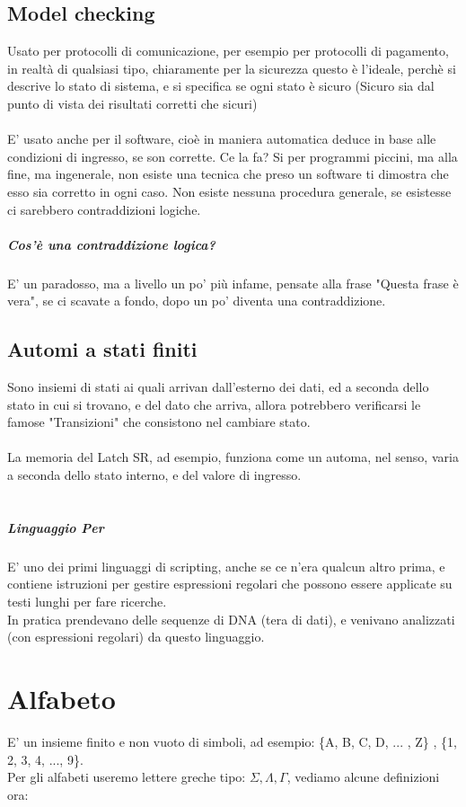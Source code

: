 \documentclass[12pt, a4paper, openany, oneside]{book}
\begin{document}
\section{Model checking}
Usato per protocolli di comunicazione, per esempio per protocolli di pagamento,
in realtà di qualsiasi tipo, chiaramente per la sicurezza questo è l'ideale, 
perchè si descrive lo stato di sistema, e si specifica se ogni stato è sicuro
(Sicuro sia dal punto di vista dei risultati corretti che sicuri)
\\ \\
E' usato anche per il software, cioè in maniera automatica deduce in base alle
condizioni di ingresso, se son corrette. Ce la fa? Si per programmi piccini, 
ma alla fine, ma ingenerale, non esiste una tecnica che preso un software ti 
dimostra che esso sia corretto in ogni caso. Non esiste nessuna procedura generale,
se esistesse ci sarebbero contraddizioni logiche.
\paragraph{Cos'è una contraddizione logica?} 
E' un paradosso, ma a livello un po' più infame, pensate alla frase "Questa 
frase è vera", se ci scavate a fondo, dopo un po' diventa una contraddizione.
\section{Automi a stati finiti}
Sono insiemi di stati ai quali arrivan dall'esterno dei dati, ed a seconda dello
stato in cui si trovano, e del dato che arriva, allora potrebbero verificarsi le
famose "Transizioni" che consistono nel cambiare stato.
\\ \\ 
La memoria del Latch SR, ad esempio, funziona come un automa, nel senso, varia
a seconda dello stato interno, e del valore di ingresso.
\\ \\
\paragraph{Linguaggio Per} E' uno dei primi linguaggi di scripting, anche se ce 
n'era qualcun altro prima, e contiene istruzioni per gestire espressioni regolari
che possono essere applicate su testi lunghi per fare ricerche.\\ 
In pratica prendevano delle sequenze di DNA (tera di dati), e venivano analizzati
(con espressioni regolari) da questo linguaggio.
\chapter{Alfabeto}
E' un insieme finito e non vuoto di simboli, ad esempio:
\{A, B, C, D, ... , Z\} , \{1, 2, 3, 4, ..., 9\}. \\ 
Per gli alfabeti useremo lettere greche tipo: $\Sigma, \Lambda, \Gamma$, vediamo
alcune definizioni ora:
\end{document}
